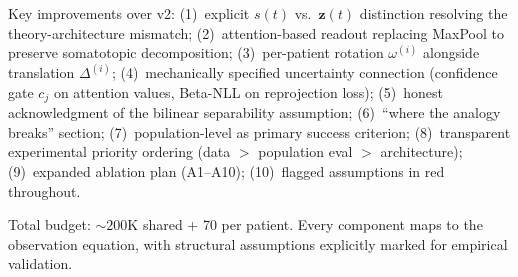 \documentclass[11pt,letterpaper]{article}
\newcommand{\bfz}{\mathbf{z}}
\begin{document}
Key improvements over v2: (1)~explicit $s(t)$ vs.\ $\bfz(t)$ distinction resolving the theory-architecture mismatch; (2)~attention-based readout replacing MaxPool to preserve somatotopic decomposition; (3)~per-patient rotation $\omega^{(i)}$ alongside translation $\Delta^{(i)}$; (4)~mechanically specified uncertainty connection (confidence gate $c_j$ on attention values, Beta-NLL on reprojection loss); (5)~honest acknowledgment of the bilinear separability assumption; (6)~``where the analogy breaks'' section; (7)~population-level as primary success criterion; (8)~transparent experimental priority ordering (data $>$ population eval $>$ architecture); (9)~expanded ablation plan (A1--A10); (10)~flagged assumptions in red throughout.

Total budget: ${\sim}200$K shared + 70 per patient. Every component maps to the observation equation, with structural assumptions explicitly marked for empirical validation.
\end{document}
